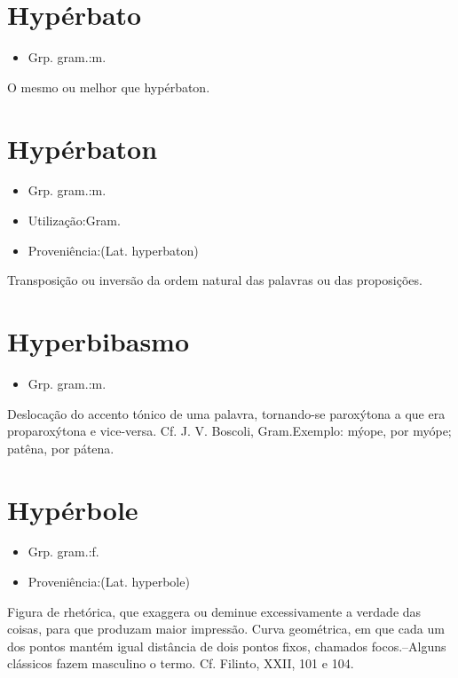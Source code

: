 \documentclass{article}
\begin{document}
\section{Hypérbato}
\begin{itemize}
\item {Grp. gram.:m.}
\end{itemize}
O mesmo ou melhor que \textunderscore hypérbaton\textunderscore .
\section{Hypérbaton}
\begin{itemize}
\item {Grp. gram.:m.}
\end{itemize}
\begin{itemize}
\item {Utilização:Gram.}
\end{itemize}
\begin{itemize}
\item {Proveniência:(Lat. \textunderscore hyperbaton\textunderscore )}
\end{itemize}
Transposição ou inversão da ordem natural das palavras ou das proposições.
\section{Hyperbibasmo}
\begin{itemize}
\item {Grp. gram.:m.}
\end{itemize}
Deslocação do accento tónico de uma palavra, tornando-se paroxýtona a que era proparoxýtona e vice-versa. Cf. J. V. Boscoli, \textunderscore Gram.\textunderscore  Exemplo: \textunderscore mýope\textunderscore , por \textunderscore myópe\textunderscore ; \textunderscore patêna\textunderscore , por \textunderscore pátena\textunderscore .
\section{Hypérbole}
\begin{itemize}
\item {Grp. gram.:f.}
\end{itemize}
\begin{itemize}
\item {Proveniência:(Lat. \textunderscore hyperbole\textunderscore )}
\end{itemize}
Figura de rhetórica, que exaggera ou deminue excessivamente a verdade das coisas, para que produzam maior impressão.
Curva geométrica, em que cada um dos pontos mantém igual distância de dois pontos fixos, chamados focos.--Alguns clássicos fazem masculino o termo. Cf. Filinto, XXII, 101 e 104.
\end{document}
